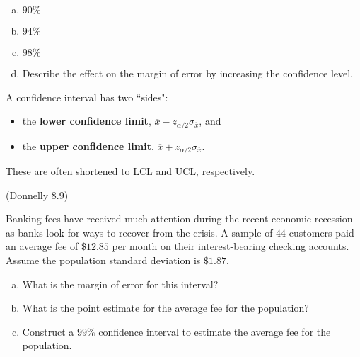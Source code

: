 \documentclass[12pt, letterpaper]{article}
\newcounter{exercise}
\theoremstyle{definition}
\begin{document}
\begin{enumerate}[(a)]

\item $90\%$

\vfill
\vfill

\item $94\%$

\vfill
\vfill

\newpage

\item $98\%$

\vfill
\vfill


\item Describe the effect on the margin of error by increasing the confidence level.

\vfill

\end{enumerate}



\begin{defn}
A confidence interval has two ``sides":
\begin{itemize}
\item the \textbf{lower confidence limit}, $\overline{x}-z_{\alpha/2}\sigma_{\overline{x}}$, and 
\item the \textbf{upper confidence limit}, $\overline{x}+z_{\alpha/2}\sigma_{\overline{x}}$.
\end{itemize}
These are often shortened to LCL and UCL, respectively.
\end{defn}


\begin{exercise}  (Donnelly 8.9)

Banking fees have received much attention during the recent economic recession as banks look for ways to recover from the crisis.  A sample of $44$ customers paid an average fee of $\$12.85$ per month on their interest-bearing checking accounts.  Assume the population standard deviation is $\$1.87$.

\end{exercise}

\begin{enumerate}[(a)]

\item What is the margin of error for this interval?

\vfill
\vfill

\item What is the point estimate for the average fee for the population?

\vfill

\item Construct a $99\%$ confidence interval to estimate the average fee for the population.

\vfill


\end{enumerate}
\end{document}

